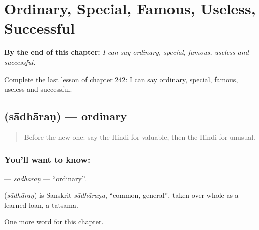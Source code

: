 
\chapter{Ordinary, Special, Famous, Useless, Successful}
\label{ch:hi-ordinary-special-famous-useless-successful}

\begin{chapteropening}
\textbf{By the end of this chapter:} \emph{I can say ordinary, special, famous, useless and successful.}

Complete the last lesson of chapter 242: I can say ordinary, special, famous, useless and successful.
\end{chapteropening}

\section[\texorpdfstring{\hi{साधारण} (sādhāraṇ)}{साधारण (sādhāraṇ)}]{ (sādhāraṇ) — ordinary}

\label{lesson:HI-C242-sadharan}



\begin{quote}
Before the new one: say the Hindi for valuable, then the Hindi for unusual.
\end{quote}

\subsection*{You'll want to know: }
\textbf{} — \emph{sādhāraṇ} — \textquotedblleft{}ordinary\textquotedblright{}.

\begin{cousinweb}
\textbf{} (\emph{sādhāraṇ}) is Sanskrit \emph{sādhāraṇa}, \textquotedblleft{}common, general\textquotedblright{}, taken over whole as a learned loan, a tatsama.
\end{cousinweb}

\begin{grammarlens}[title={What you've built}]
One more word for this chapter.
\end{grammarlens}


